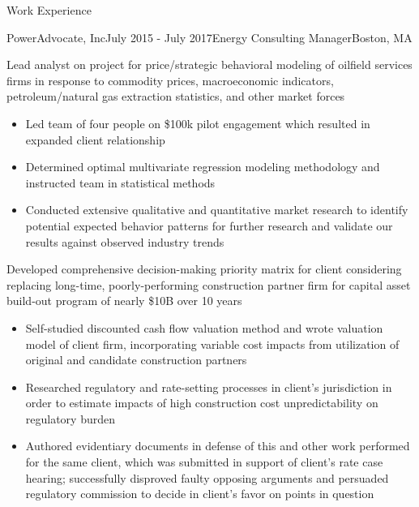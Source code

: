 \documentclass{resume} %
\begin{document}

\begin{rSection}{Work Experience}

\begin{rSubsection}{PowerAdvocate, Inc}{July 2015 - July 2017}{Energy Consulting Manager}{Boston, MA}
  \setlength{\itemsep}{-5pt}
  \item Lead analyst on project for price/strategic behavioral modeling of oilfield services firms in response to commodity prices, macroeconomic indicators, petroleum/natural gas extraction statistics, and other market forces
  \begin{itemize}
    \item Led team of four people on \$100k pilot engagement which resulted in expanded client relationship
    \item Determined optimal multivariate regression modeling methodology and instructed team in statistical methods
    \item Conducted extensive qualitative and quantitative market research to identify potential expected behavior patterns for further research and validate our results against observed industry trends
  \end{itemize}
  \item Developed comprehensive decision-making priority matrix for client considering replacing long-time, poorly-performing construction partner firm for capital asset build-out program of nearly \$10B over 10 years
  \begin{itemize}
    \setlength{\itemsep}{-5pt}
    \item Self-studied discounted cash flow valuation method and wrote valuation model of client firm, incorporating variable cost impacts from utilization of original and candidate construction partners
    \item Researched regulatory and rate-setting processes in client's jurisdiction in order to estimate impacts of high construction cost unpredictability on regulatory burden
    \item Authored evidentiary documents in defense of this and other work performed for the same client, which was submitted in support of client's rate case hearing; successfully disproved faulty opposing arguments and persuaded regulatory commission to decide in client's favor on points in question
  \end{itemize}
\end{rSubsection}


\end{rSection}
\end{document}
